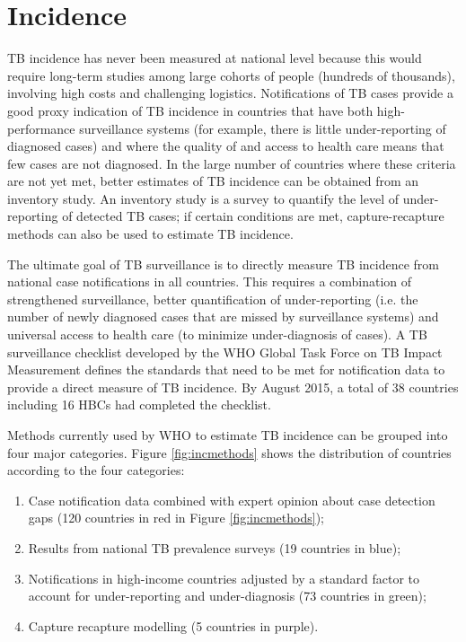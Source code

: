 \section{Incidence}

TB incidence has never been measured at national level because this would require long-term studies among large cohorts of people (hundreds of thousands), involving high costs and challenging logistics. Notifications of TB cases provide a good proxy indication of TB incidence in countries that have both high-performance surveillance systems (for example, there is little under-reporting of diagnosed cases) and where the quality of and access to health care means that few cases are not diagnosed. In the large number of countries where these criteria are not yet met, better estimates of TB incidence can be obtained from an inventory study. An inventory study is a survey to quantify the level of under-reporting of detected TB cases; if certain conditions are met, capture-recapture methods can also be used to estimate TB incidence\cite{WHO2012}. 

The ultimate goal of TB surveillance is to directly measure TB incidence from national case notifications in all countries. This requires a combination of strengthened surveillance, better quantification of under-reporting (i.e. the number of newly diagnosed cases that are missed by surveillance systems) and universal access to health care (to minimize under-diagnosis of cases). A TB surveillance checklist developed by the WHO Global Task Force on TB Impact Measurement defines the standards that need to be met for notification data to provide a direct measure of TB incidence\cite{WHO2014}. By August 2015, a total of 38 countries including 16 HBCs had completed the checklist. 

Methods currently used by WHO to estimate TB incidence can be grouped into four major categories. Figure \ref{fig:incmethods} shows the distribution of countries according to the four categories: 

\begin{enumerate}
\item Case notification data combined with expert opinion about case detection gaps (120 countries in red in Figure \ref{fig:incmethods});
\item Results from national TB prevalence surveys (19 countries in blue);
\item Notifications in high-income countries adjusted by a standard factor to account for under-reporting and under-diagnosis (73 countries in green);
\item Capture recapture modelling (5 countries in purple).
\end{enumerate}






  
  
  
  
  
  
  
  
  
  